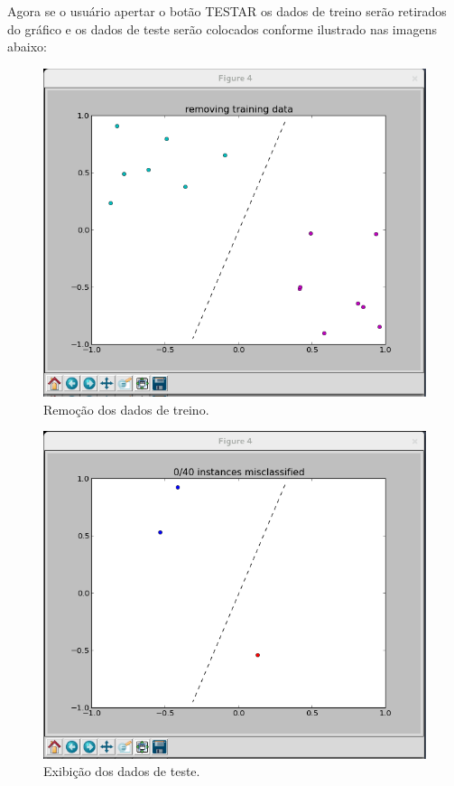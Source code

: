 \documentclass[brazil, a4paper]{article}
\begin{document}
\begin{itemize}
Agora se o usuário apertar o botão TESTAR os dados de treino serão retirados do gráfico e os dados de teste serão colocados conforme ilustrado nas imagens abaixo:

\begin{figure}[!htb]
\centering
\includegraphics[scale=0.25]{ex2-t1.png}
\caption{Remoção dos dados de treino.}
\end{figure}

\newpage

\begin{figure}[!htb]
\centering
\includegraphics[scale=0.25]{ex2-t2.png}
\caption{Exibição dos dados de teste.}
\end{figure}


\end{itemize}
\end{document}
